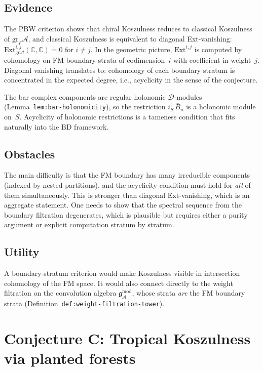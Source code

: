 \documentclass[11pt]{article}
\newcommand{\cA}{\mathcal{A}}
\newcommand{\cD}{\mathcal{D}}
\newcommand{\bC}{\mathbb{C}}
\newcommand{\fg}{\mathfrak{g}}
\newcommand{\barB}{\bar{B}}
\newcommand{\Ext}{\mathrm{Ext}}
\newcommand{\gr}{\mathrm{gr}}
\theoremstyle{plain}
\theoremstyle{definition}
\theoremstyle{remark}
\begin{document}
\subsection{Evidence}

The PBW criterion shows that chiral Koszulness reduces to
classical Koszulness of $\gr_F\cA$, and classical Koszulness is
equivalent to diagonal Ext-vanishing:
$\Ext^{i,j}_{\gr\cA}(\bC,\bC) = 0$ for $i \neq j$.  In the
geometric picture, $\Ext^{i,j}$ is computed by cohomology on FM
boundary strata of codimension~$i$ with coefficient in weight~$j$.
Diagonal vanishing translates to: cohomology of each boundary
stratum is concentrated in the expected degree, i.e., acyclicity
in the sense of the conjecture.

The bar complex components are regular holonomic $\cD$-modules
(Lemma~\texttt{lem:bar-holonomicity}), so the restriction
$i_S^!\,\barB_n$ is a holonomic module on~$S$.  Acyclicity of
holonomic restrictions is a tameness condition that fits naturally
into the BD framework.

\subsection{Obstacles}

The main difficulty is that the FM boundary has many irreducible
components (indexed by nested partitions), and the acyclicity
condition must hold for \emph{all} of them simultaneously.
This is stronger than diagonal Ext-vanishing, which is an
aggregate statement.  One needs to show that the spectral
sequence from the boundary filtration degenerates, which is
plausible but requires either a purity argument or explicit
computation stratum by stratum.

\subsection{Utility}

A boundary-stratum criterion would make Koszulness visible in
intersection cohomology of the FM space.  It would also connect
directly to the weight filtration on the convolution algebra
$\fg^{\mathrm{mod}}_\cA$, whose strata \emph{are} the FM boundary
strata (Definition~\texttt{def:weight-filtration-tower}).


\section{Conjecture C: Tropical Koszulness via planted forests}
\label{sec:tropical}
\end{document}
